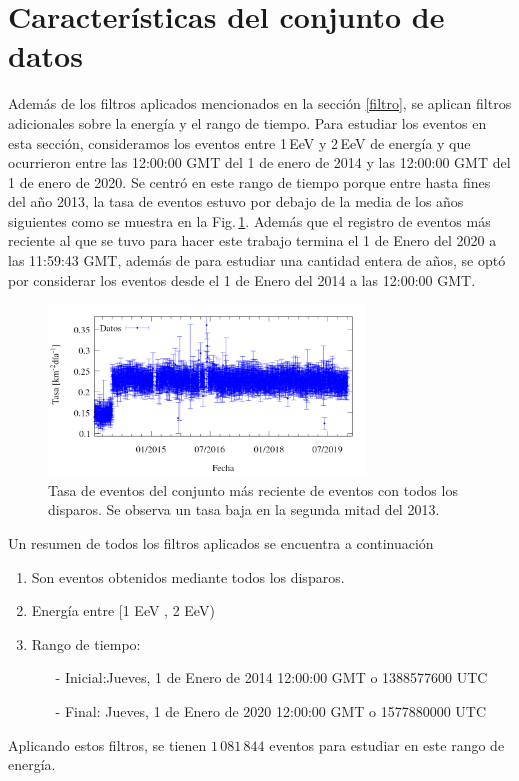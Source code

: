 \section{Características del conjunto de datos} \label{specs}

	Además de los filtros aplicados mencionados en la sección \ref{filtro}, se aplican filtros adicionales sobre la energía y el rango de tiempo. Para estudiar los eventos en esta sección, consideramos los eventos entre 1\,EeV y 2\,EeV de energía y que ocurrieron entre las 12:00:00 GMT del 1 de enero de 2014 y las 12:00:00 GMT del 1 de enero de 2020. Se centró en este rango de tiempo porque entre hasta fines del año 2013, la tasa de eventos estuvo por debajo de la media de los años siguientes como se muestra en la Fig.\,\ref{fig:rate_2020_AllTriggers}. Además que el registro de eventos más reciente al que se tuvo para hacer este trabajo termina el 1 de Enero del 2020  a las 11:59:43 GMT, además de para estudiar una cantidad entera de años, se optó por considerar los eventos desde el 1 de Enero del 2014 a las 12:00:00 GMT.

    \begin{figure}[H]
    	\centering
    	\includegraphics[width=0.75\textwidth]{rate_over_1-2_EeV-theta-60.png}
    	\caption{Tasa de eventos del conjunto más reciente de eventos con todos los disparos. Se observa un tasa baja en la segunda mitad del 2013.}
    	\label{fig:rate_2020_AllTriggers}
    \end{figure}

	Un resumen de todos los filtros aplicados se encuentra a continuación
		\begin{enumerate}
			\item Son eventos obtenidos mediante todos los disparos.
			\item Energía entre  [1 EeV , 2 EeV)
			\item Rango de tiempo:
			\begin{itemize}
				\item[-] Inicial:Jueves, 1 de Enero de 2014 12:00:00 GMT o 1388577600 UTC
				\item[-] Final:  Jueves, 1 de Enero de 2020 12:00:00 GMT o 1577880000 UTC
			\end{itemize}

		\end{enumerate}
	Aplicando estos filtros, se tienen $1\,081\,844$ eventos para estudiar en este rango de energía. 

